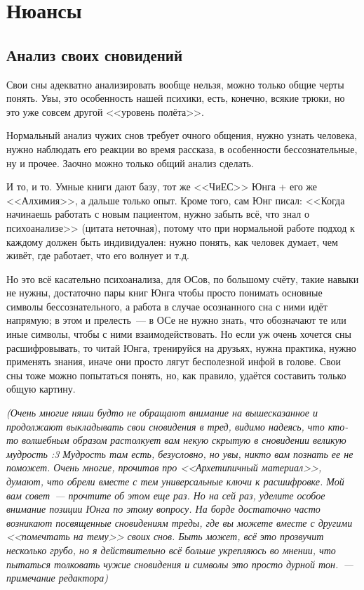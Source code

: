 \documentclass[a5paper,12pt,twoside]{memoir}
\begin{document}
\chapter{Нюансы}


\section{Анализ своих сновидений}
Свои сны адекватно анализировать вообще нельзя, можно только общие черты понять. Увы, это особенность нашей психики, есть, конечно, всякие трюки, но это уже совсем другой <<уровень полёта>>.

Нормальный анализ чужих снов требует очного общения, нужно узнать человека, нужно наблюдать его реакции во время рассказа, в особенности бессознательные, ну и прочее. 
Заочно можно только общий анализ сделать.
 
\medskip


\medskip

И то, и то. Умные книги дают базу, тот же <<ЧиЕС>> Юнга + его же <<Алхимия>>, а дальше только опыт. Кроме того, сам Юнг писал: <<Когда начинаешь работать с новым пациентом, нужно забыть всё, что знал о психоанализе>> (цитата неточная), потому что при нормальной работе подход к каждому должен быть индивидуален: нужно понять, как человек думает, чем живёт, где работает, что его волнует и т.д.

Но это всё касательно психоанализа, для ОСов, по большому счёту, такие навыки не нужны, достаточно пары книг Юнга чтобы просто понимать основные символы бессознательного, а работа в случае осознанного сна с ними идёт напрямую; в этом и прелесть~--- в ОСе не нужно знать, что обозначают те или иные символы, чтобы с ними взаимодействовать. Но если уж очень хочется сны расшифровывать, то читай Юнга, тренируйся на друзьях, нужна практика, нужно применять знания, иначе они просто лягут бесполезной инфой в голове. Свои сны тоже можно попытаться понять, но, как правило, удаётся составить только общую картину.

\medskip

\textit{(Очень многие няши будто не обращают внимание на вышесказанное и продолжают выкладывать свои сновидения в тред, видимо надеясь, что кто-то волшебным образом растолкует вам некую скрытую в сновидении великую мудрость :3 Мудрость там есть, безусловно, но увы, никто вам познать ее не поможет. Очень многие, прочитав про <<Архетипичный материал>>, думают, что обрели вместе с тем универсальные ключи к расшифровке. Мой вам совет~--- прочтите об этом еще раз. Но на сей раз, уделите особое внимание позиции Юнга по этому вопросу. На борде достаточно часто возникают посвященные сновидениям треды, где вы можете вместе с другими <<помечтать на тему>> своих снов. Быть может, всё это прозвучит несколько грубо, но я действительно всё больше укрепляюсь во мнении, что пытаться толковать чужие сновидения и символы это просто дурной тон.~--- примечание редактора)}
\end{document}
